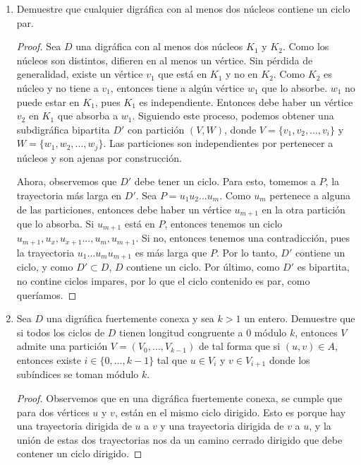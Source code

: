 \documentclass{article}
\begin{document}
\begin{enumerate}
  \item Demuestre que cualquier digr\'afica con al menos dos n\'ucleos
    contiene un ciclo par.

    \begin{proof}
      Sea $D$ una digr\'afica con al menos dos n\'ucleos $K_1$ y $K_2$. Como los
      n\'ucleos son distintos, difieren en al menos un v\'ertice. Sin p\'erdida de
      generalidad, existe un v\'ertice $v_1$ que est\'a en $K_1$ y no en $K_2$. Como
      $K_2$ es n\'ucleo y no tiene a $v_1$, entonces tiene a alg\'un v\'ertice $w_1$
      que lo absorbe. $w_1$ no puede estar en $K_1$, pues $K_1$ es
      independiente. Entonces debe haber un v\'ertice $v_2$ en $K_1$ que absorba a
      $w_1$. Siguiendo este proceso, podemos obtener una subdigr\'afica bipartita $D'$ con
      partici\'on $(V, W)$, donde $V = \{v_1, v_2, ..., v_i\}$ y $W = \{w_1,
      w_2, ..., w_j\}$. Las particiones son independientes por pertenecer a
      n\'ucleos y son ajenas por construcci\'on.

      Ahora, observemos que $D'$ debe tener un ciclo. Para esto, tomemos a $P$, la
      trayectoria m\'as larga en $D'$. Sea $P = u_1 u_2 ... u_m$. Como $u_m$
      pertenece a alguna de las particiones, entonces debe haber un v\'ertice
      $u_{m+1}$ en
      la otra partici\'on que lo absorba. Si $u_{m+1}$ est\'a en $P$, entonces
      tenemos un ciclo $u_{m+1}, u_x, u_{x+1}..., u_m, u_{m+1}$. Si no, entonces
      tenemos una contradicci\'on, pues la trayectoria $u_1...u_mu_{m+1}$ es
      m\'as larga que $P$. Por lo tanto, $D'$ contiene un ciclo, y como $D'
      \subset D$, $D$ contiene un ciclo. Por \'ultimo, como $D'$ es bipartita,
      no contine ciclos impares, por lo que el ciclo contenido es par, como quer\'iamos.
    \end{proof}

  \item Sea $D$ una digr\'afica fuertemente conexa y sea $k > 1$ un entero.
    Demuestre que si todos los ciclos de $D$ tienen longitud congruente a
    $0$ m\'odulo $k$, entonces $V$ admite una partici\'on $V = (V_0, \dots,
    V_{k-1})$ de tal forma que si $(u,v) \in A$, entonces existe $i \in
    \{ 0, \dots, k-1 \}$ tal que $u \in V_i$ y $v \in V_{i+1}$ donde los
    sub\'indices se toman m\'odulo $k$.

    \begin{proof}
      Observemos que en una digráfica fuertemente conexa, se cumple que para dos
      vértices $u$ y $v$, están en el mismo ciclo dirigido. Esto es porque hay
      una trayectoria dirigida de $u$ a $v$ y una trayectoria dirigida de $v$ a
      $u$, y la unión de estas dos trayectorias nos da un camino cerrado
      dirigido que debe contener un ciclo dirigido.


\end{proof}
\end{enumerate}
\end{document}
